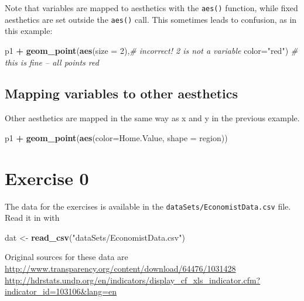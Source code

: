 \documentclass[]{book}
\newenvironment{Shaded}{\begin{snugshade}}{\end{snugshade}}
\newcommand{\KeywordTok}[1]{\textcolor[rgb]{0.13,0.29,0.53}{\textbf{#1}}}
\newcommand{\DataTypeTok}[1]{\textcolor[rgb]{0.13,0.29,0.53}{#1}}
\newcommand{\DecValTok}[1]{\textcolor[rgb]{0.00,0.00,0.81}{#1}}
\newcommand{\StringTok}[1]{\textcolor[rgb]{0.31,0.60,0.02}{#1}}
\newcommand{\CommentTok}[1]{\textcolor[rgb]{0.56,0.35,0.01}{\textit{#1}}}
\newcommand{\OperatorTok}[1]{\textcolor[rgb]{0.81,0.36,0.00}{\textbf{#1}}}
\newcommand{\NormalTok}[1]{#1}
\begin{document}
Note that variables are mapped to aesthetics with the \texttt{aes()}
function, while fixed aesthetics are set outside the \texttt{aes()}
call. This sometimes leads to confusion, as in this example:

\begin{Shaded}
\begin{Highlighting}[]
\NormalTok{p1 }\OperatorTok{+}
\StringTok{  }\KeywordTok{geom_point}\NormalTok{(}\KeywordTok{aes}\NormalTok{(}\DataTypeTok{size =} \DecValTok{2}\NormalTok{),}\CommentTok{# incorrect! 2 is not a variable}
             \DataTypeTok{color=}\StringTok{"red"}\NormalTok{) }\CommentTok{# this is fine -- all points red}
\end{Highlighting}
\end{Shaded}

\subsection{Mapping variables to other
aesthetics}\label{mapping-variables-to-other-aesthetics}

Other aesthetics are mapped in the same way as x and y in the previous
example.

\begin{Shaded}
\begin{Highlighting}[]
\NormalTok{p1 }\OperatorTok{+}
\StringTok{  }\KeywordTok{geom_point}\NormalTok{(}\KeywordTok{aes}\NormalTok{(}\DataTypeTok{color=}\NormalTok{Home.Value, }\DataTypeTok{shape =}\NormalTok{ region))}
\end{Highlighting}
\end{Shaded}

\section{Exercise 0}\label{exercise-0-2}

The data for the exercises is available in the
\texttt{dataSets/EconomistData.csv} file. Read it in with

\begin{Shaded}
\begin{Highlighting}[]
\NormalTok{dat <-}\StringTok{ }\KeywordTok{read_csv}\NormalTok{(}\StringTok{"dataSets/EconomistData.csv"}\NormalTok{)}
\end{Highlighting}
\end{Shaded}

Original sources for these data are
\url{http://www.transparency.org/content/download/64476/1031428}
\url{http://hdrstats.undp.org/en/indicators/display_cf_xls_indicator.cfm?indicator_id=103106\&lang=en}
\end{document}
